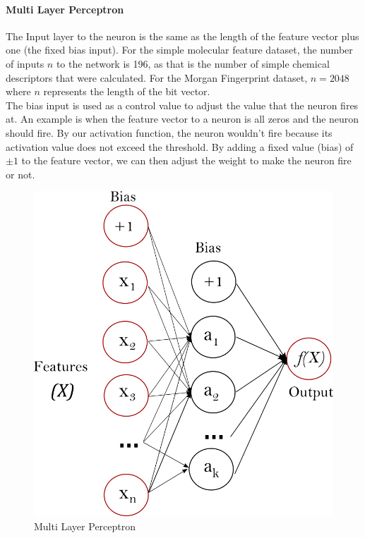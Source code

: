 \documentclass[a4paper,12pt]{report}
\begin{document}
				\paragraph{Multi Layer Perceptron}
				The Input layer to the neuron is the same as the length of the feature vector plus one (the fixed bias input). For the simple molecular feature dataset, the number of inputs $n$ to the network is 196, as that is the number of simple chemical descriptors that were calculated. For the Morgan Fingerprint dataset, $n = 2048$ where $n$ represents the length of the bit vector. \\
				The bias input is used as a control value to adjust the value that the neuron fires at. An example is when the feature vector to a neuron is all zeros and the neuron should fire. By our activation function, the neuron wouldn't fire because its activation value does not exceed the threshold. By adding a fixed value (bias) of $\pm1$ to the feature vector, we can then adjust the weight to make the neuron fire or not.
				\begin{figure}[H]
					\centering
					\includegraphics[width=\textwidth,scale=1,totalheight=0.5\textheight]{images/multilayerperceptronnetwork}
					\caption{Multi Layer Perceptron \cite{ScikitLearn2016}}
					\label{fig:mlp}
				\end{figure}
\end{document}
